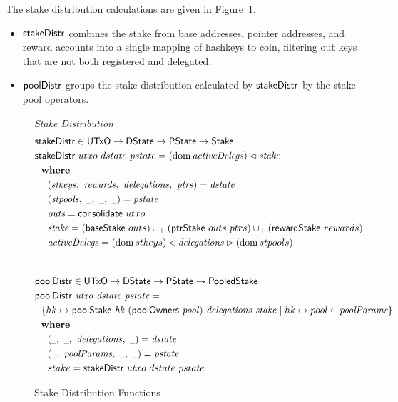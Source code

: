 The stake distribution calculations are given in Figure~\ref{fig:functions:stake-distribution}.
\begin{itemize}
  \item $\mathsf{stakeDistr}$ combines the stake from base addresses, pointer addresses, and reward
    accounts into a single mapping of hashkeys to coin, filtering out keys that are not both
    registered and delegated.
  \item $\mathsf{poolDistr}$ groups the stake distribution calculated by $\mathsf{stakeDistr}$
    by the stake pool operators.
\end{itemize}

\begin{figure}[htb]
  \emph{Stake Distribution}
  \begin{align*}
      & \fun{stakeDistr} \in \UTxO \to \DState \to \PState \to \Stake \\
      & \fun{stakeDistr}~{utxo}~{dstate}~{pstate} =
          (\dom{\var{activeDelegs}})\restrictdom\var{stake}\\
      & \where \\
      & ~~~~ (\var{stkeys},~\var{rewards},~\var{delegations},~\var{ptrs}) = \var{dstate} \\
      & ~~~~ (\var{stpools},~\wcard,~\wcard,~\wcard) = \var{pstate} \\
      & ~~~~ \var{outs} = \fun{consolidate}~{utxo} \\
      & ~~~~ \var{stake} = (\fun{baseStake}~{outs})
                             \unionoverridePlus (\fun{ptrStake}~{outs}~{ptrs})
                             \unionoverridePlus (\fun{rewardStake}~{rewards}) \\
      & ~~~~ \var{activeDelegs} =
               (\dom{stkeys}) \restrictdom \var{delegations} \restrictrange (\dom{stpools}) \\
      \nextdef
      & \fun{poolDistr} \in \UTxO \to \DState \to \PState \to \PooledStake \\
      & \poolDistr{utxo}{dstate}{pstate} = \\
      & ~~ \{hk \mapsto \poolStake{hk}{(\fun{poolOwners}~\var{pool})}{delegations}{stake}
           \mid
           hk\mapsto pool \in \var{poolParams} \} \\
      & \where \\
      & ~~~~ (\wcard,~\wcard,~\var{delegations},~\wcard) = \var{dstate} \\
      & ~~~~ (\wcard,~\var{poolParams},~\wcard,~\wcard) = \var{pstate} \\
      & ~~~~ stake = \fun{stakeDistr}~{utxo}~{dstate}~{pstate}\\
  \end{align*}

  \caption{Stake Distribution Functions}
  \label{fig:functions:stake-distribution}
\end{figure}

